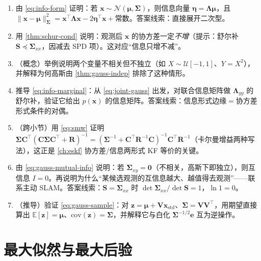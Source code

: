 \begin{practice}
\begin{enumerate}
  \item 由 \cref{eq:info-form} 证明：若 $\mathbf{x}\sim\mathcal{N}(\boldsymbol{\mu},\boldsymbol{\Sigma})$，则信息向量 $\boldsymbol{\eta}=\boldsymbol{\Lambda}\boldsymbol{\mu}$，且 $\|\mathbf{x}-\boldsymbol{\mu}\|_{\boldsymbol{\Sigma}}^2=\mathbf{x}^\top\boldsymbol{\Lambda}\mathbf{x}-2\boldsymbol{\eta}^\top\mathbf{x}+\text{常数}$。答案线索：直接展开二次型。
  \item 用 \cref{thm:schur-cond} 说明：观测后 $\mathbf{x}$ 的协方差一定\emph{不增}（提示：舒尔补 $\mathbf{S}\preceq\boldsymbol{\Sigma}_{xx}$，因减去 SPD 项）。这对应“信息只增不减”。
  \item （概念）举例说明两个变量不相关但不独立（如 $X\sim\mathcal{U}[-1,1]$、$Y=X^2$），并解释为何高斯由 \cref{thm:gauss-indep} 排除了这种情形。
  \item 推导 \cref{eq:info-marginal}：从 \cref{eq:joint-gauss} 出发，对联合信息矩阵做 $\boldsymbol{\Lambda}_{yy}$ 的舒尔补，验证它给出 $p(\mathbf{x})$ 的信息矩阵。答案线索：信息形式边缘$=$协方差形式条件的对偶。
  \item （跨小节）用 \cref{eq:smw} 证明 $\boldsymbol{\Sigma}\mathbf{C}^\top(\mathbf{C}\boldsymbol{\Sigma}\mathbf{C}^\top+\mathbf{R})^{-1}=(\boldsymbol{\Sigma}^{-1}+\mathbf{C}^\top\mathbf{R}^{-1}\mathbf{C})^{-1}\mathbf{C}^\top\mathbf{R}^{-1}$（卡尔曼增益两种写法），这正是 \cref{ch:eskf} 协方差/信息两形式 KF 等价的关键。
  \item 由 \cref{eq:gauss-mutual-info} 说明：若 $\boldsymbol{\Sigma}_{xy}=\mathbf{0}$（不相关，高斯下即独立），则互信息 $I=0$。再说明为什么“某候选观测的互信息越大、越值得去观测”——联系主动 SLAM。答案线索：$\mathbf{S}=\boldsymbol{\Sigma}_{xx}$ 时 $\det\boldsymbol{\Sigma}_{xx}/\det\mathbf{S}=1$，$\ln 1=0$。
  \item （推导）验证 \cref{eq:gauss-sample}：对 $\mathbf{z}=\boldsymbol{\mu}+\mathbf{V}\mathbf{x}_{\text{std}}$、$\boldsymbol{\Sigma}=\mathbf{V}\mathbf{V}^\top$，用期望直接算出 $\mathbb{E}[\mathbf{z}]=\boldsymbol{\mu}$、$\mathrm{cov}(\mathbf{z})=\boldsymbol{\Sigma}$，并解释它与白化 $\boldsymbol{\Sigma}^{-1/2}\mathbf{e}$ 互为逆操作。
\end{enumerate}
\end{practice}

\section{最大似然与最大后验}
\label{sec:est-mle-map}

